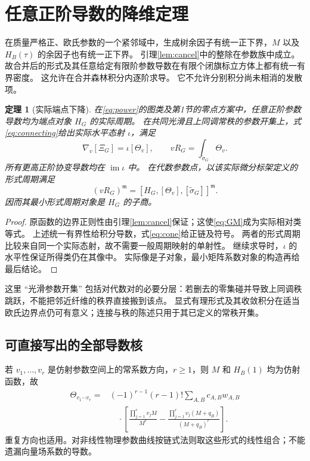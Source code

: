 \documentclass[11pt,a4paper]{ctexart}
\theoremstyle{cnplain}
\newtheorem{theorem}{定理}[section]
\theoremstyle{remark}\newtheorem{remark}[theorem]{注}
\newcommand{\im}{\operatorname{im}}
\begin{document}
\section{任意正阶导数的降维定理}
在质量严格正、欧氏参数的一个紧邻域中，生成树余因子有统一正下界，$M$ 以及 $H_B(\tau)$ 的余因子也有统一正下界。
引理\ref{lem:cancel}中的整除在参数族中成立。
故合并后的形式及其任意给定有限阶参数导数在有限个闭旗标立方体上都有统一有界密度。
这允许在合并森林积分内逐阶求导。
它不允许分别积分尚未相消的发散项。

\begin{theorem}[实际端点下降]\label{thm:descent}
在\eqref{eq:power}的图类及第1节的零点方案中，任意正阶参数导数均为端点对象 $H_G$ 的实际周期。
在共同光滑且上同调常秩的参数开集上，式\eqref{eq:connecting}给出实际水平态射 $\iota$，满足
\begin{equation}\label{eq:descent}
 \nabla_v[\Xi_G]=\iota[\Theta_v],\qquad
 vR_G=\int_{\widetilde\sigma_G}\Theta_v.
\end{equation}
所有更高正阶协变导数均在 $\im\iota$ 中。
在代数参数点，以该实际微分标架定义的形式周期满足
\begin{equation}\label{eq:motivic}
 (vR_G)^{\mathfrak m}
     =[H_G,[\Theta_v],[\widetilde\sigma_G]]^{\mathfrak m}.
\end{equation}
因而其最小形式周期对象是 $H_G$ 的子商。
\end{theorem}
\begin{proof}
原函数的边界正则性由引理\ref{lem:cancel}保证；这使\eqref{eq:GM}成为实际相对类等式。
上述统一有界性给积分导数，式\eqref{eq:cone}给正链及符号。
两者的形式周期比较来自同一个实际态射，故不需要一般周期映射的单射性。
继续求导时，$\iota$ 的水平性保证所得类仍在其像中。
实际像是子对象，最小矩阵系数对象的构造再给最后结论。
\end{proof}

这里 ``光滑参数开集'' 包括对代数对的必要分层：若删去的零集碰并导致上同调秩跳跃，不能把邻近纤维的秩界直接搬到该点。
显式有理形式及其收敛积分在适当欧氏边界点仍可有意义；连接与秩的陈述只用于其已定义的常秩开集。

\subsection{可直接写出的全部导数核}
若 $v_1,\ldots,v_r$ 是仿射参数空间上的常系数方向，$r\geq1$，则 $M$ 和 $H_B(1)$ 均为仿射函数，故
\begin{align}\label{eq:allorders}
 \Theta_{v_1\cdots v_r}
 ={}&(-1)^{r-1}(r-1)!\sum_{A,B}c_{A,B}w_{A,B}\nonumber\\[-2pt]
 &\quad\cdot\left[
 \frac{\prod_{j=1}^r v_jM}{M^r}
 -\frac{\prod_{j=1}^r v_j(M+q_B)}{(M+q_B)^r}
 \right].
\end{align}
重复方向也适用。对非线性物理参数曲线按链式法则取这些形式的线性组合；不能遗漏向量场系数的导数。
\end{document}
